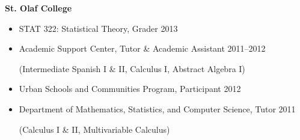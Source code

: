 \documentclass[margin]{res}
\begin{document}
\begin{resume}
\textbf{St. Olaf College}
\begin{itemize}
\item STAT 322: Statistical Theory, Grader \hfill 2013 
\item Academic Support Center, Tutor \& Academic Assistant \hfill 2011--2012 \\
\begin{footnotesize}(Intermediate Spanish I \& II, Calculus I, Abstract Algebra I)\end{footnotesize}
\item Urban Schools and Communities Program, Participant \hfill 2012 
\item Department of Mathematics, Statistics, and Computer Science, Tutor  \hfill 2011 \\
\begin{footnotesize}(Calculus I \& II, Multivariable Calculus) \end{footnotesize} \\ 
\end{itemize}


\end{resume}
\end{document}
